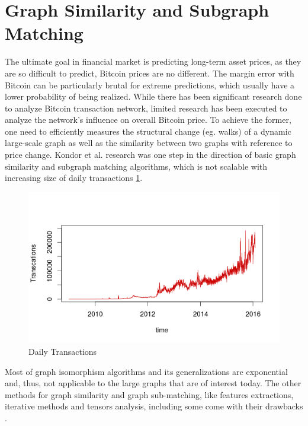 \section{Graph Similarity and Subgraph Matching}
\label{sec:gs}
The ultimate goal in financial market is predicting long-term asset prices, as they are so difficult to predict, Bitcoin prices are no different. The margin error with Bitcoin can be particularly brutal for extreme predictions, which usually have a lower probability of being realized. While
there has been significant research done to analyze Bitcoin transaction network, limited research has been executed to analyze the network’s influence on overall Bitcoin price. To achieve the former, one need to efficiently measures the structural change (eg. walks) of a dynamic
large-scale graph as well as the similarity between two graphs with
reference to price change. Kondor et al. \citep{Kondor2014} research was one step in the direction of basic graph similarity and subgraph matching algorithms, which is not scalable with increasing size of daily transactions \ref{fig:transactions}. 

\begin{figure}[ht]
\begin{center}
\includegraphics[width=\textwidth]{./Figures/transactions.png}
\caption{Daily Transactions}
\label{fig:transactions}
\end{center}
\end{figure}

Most of graph isomorphism algorithms and its generalizations are exponential and, thus, not applicable to the large graphs that are of interest today. The other methods  for graph similarity and graph sub-matching, like features extractions, iterative methods and tensors analysis, including some come with their drawbacks \citep{Zager2008}.

